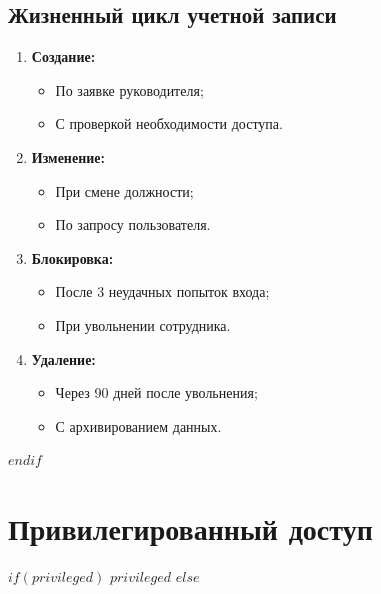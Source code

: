 \documentclass[14pt,a4paper]{extarticle}
\begin{document}
\subsection{Жизненный цикл учетной записи}
\begin{enumerate}
    \item \textbf{Создание:}
    \begin{itemize}
        \item По заявке руководителя;
        \item С проверкой необходимости доступа.
    \end{itemize}
    
    \item \textbf{Изменение:}
    \begin{itemize}
        \item При смене должности;
        \item По запросу пользователя.
    \end{itemize}
    
    \item \textbf{Блокировка:}
    \begin{itemize}
        \item После 3 неудачных попыток входа;
        \item При увольнении сотрудника.
    \end{itemize}
    
    \item \textbf{Удаление:}
    \begin{itemize}
        \item Через 90 дней после увольнения;
        \item С архивированием данных.
    \end{itemize}
\end{enumerate}
$endif$

\section{Привилегированный доступ}
\label{sec:privileged}

$if(privileged)$
$privileged$
$else$
\end{document}
